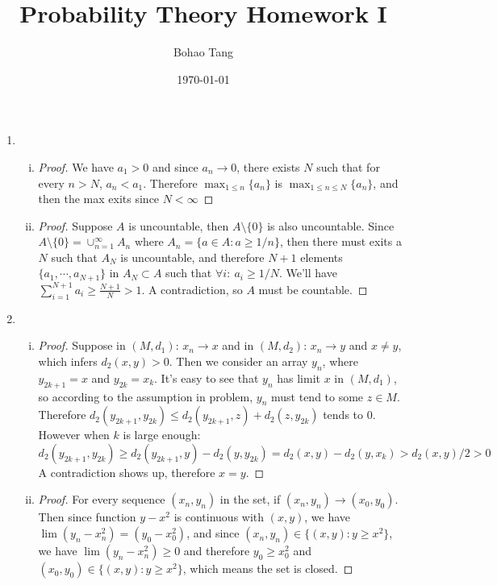 \documentclass[11pt]{article}
\title{Probability Theory Homework I}
\author{Bohao Tang}
\date{\today}
\begin{document}
\maketitle

\begin{enumerate}[1]
	\item
	\begin{enumerate}[(i)]
		\item 
		\begin{proof}
		We have $a_1 > 0$ and since $a_n \to 0$, there exists $N$ such that for every $n > N$,
		$a_n < a_1$. Therefore $\max_{1 \le n} \{a_n\}$ is $\max_{1 \le n \le N} \{a_n\}$, and
		then the max exits since $N < \infty$ 
		\end{proof}
		\item
		\begin{proof}
		Suppose $A$ is uncountable, then $A \setminus \{0\}$ is also uncountable. Since
		$A \setminus \{0\} = \cup_{n=1}^{\infty} A_n$ where $A_n = \{a \in A: a \ge 1/n \}$,
		then there must exits a $N$ such that $A_N$ is uncountable, and therefore $N+1$
		elements $\{a_1,\cdots,a_{N+1}\}$ in $A_N \subset A$ such that $\forall i: \  a_i \ge 1/N$.
		We'll have $\sum_{i=1}^{N+1} a_i \ge \frac{N+1}{N} > 1$. A contradiction, so $A$
		must be countable.	
		\end{proof}
	\end{enumerate}
	\item
	\begin{enumerate}[(i)]
		\item 
		\begin{proof}
			Suppose in $(M,d_1)$: $x_n \to x$ and in $(M,d_2)$: $x_n \to y$ and $x \ne y$,
			which infers $d_2(x,y) > 0$.
			Then we consider an array $y_n$, where $y_{2k+1} = x$ and $y_{2k} = x_k$.
			It's easy to see that $y_n$ has limit $x$ in $(M,d_1)$, so according to the assumption
			in problem, $y_n$ must tend to some $z \in M$.
			Therefore $d_2(y_{2k+1}, y_{2k}) \le d_2(y_{2k+1}, z) + d_2(z, y_{2k})$ tends to $0$.
			However when $k$ is large enough:
			$$d_2(y_{2k+1}, y_{2k}) \ge d_2(y_{2k+1}, y) - d_2(y, y_{2k}) = d_2(x,y) - d_2(y,x_k) > d_2(x,y)/2 > 0$$
			A contradiction shows up, therefore $x = y$.
		\end{proof}
		\item
		\begin{proof}
			For every sequence $(x_n, y_n)$ in the set, if $(x_n, y_n) \to (x_0, y_0)$. Then since
			function $y - x^2$ is continuous with $(x,y)$, we have $\lim (y_n - x_n^2) = (y_0 - x_0^2)$, and since $(x_n,y_n) \in \{(x,y): y \ge x^2 \}$, we have $\lim (y_n - x_n^2) \ge 0$ and therefore $y_0 \ge x_0^2$ and $(x_0,y_0) \in \{(x,y): y \ge x^2 \}$, which means the set is closed.

\end{proof}
\end{enumerate}
\end{enumerate}
\end{document}

